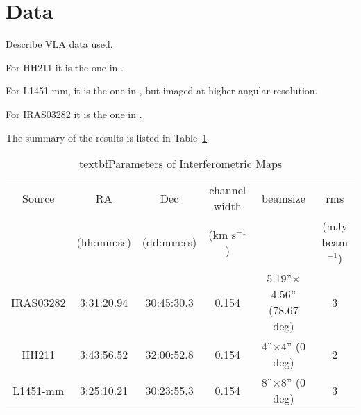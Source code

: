 \section{Data}

Describe VLA data used.

For HH211 it is the one in \cite{Tanner_2010}.

For L1451-mm, it is the one in \cite{Pineda_2011}, but imaged at higher angular resolution.

For IRAS03282 it is the one in \cite{Tobin_2011}. 

The summary of the results is listed in Table~\ref{table:obs}

\begin{table} 
\label{table:obs}
    \begin{tabular}{ c c c c c c }
        Source & RA & Dec & channel width & beamsize & rms \\ 
         & (hh:mm:ss) & (dd:mm:ss) & (km s$^{-1}$) &  & (mJy beam$^{-1}$) \\ 
        IRAS03282 & 3:31:20.94 & 30:45:30.3 & 0.154 & 5.19''$\times$4.56'' (78.67 deg) & 3 \\ 
        HH211 & 3:43:56.52 & 32:00:52.8 & 0.154 & 4''$\times$4'' (0 deg) & 2 \\ 
        L1451-mm & 3:25:10.21 & 30:23:55.3 & 0.154 & 8''$\times$8'' (0 deg) & 3 \\ 
    \end{tabular} 
    \caption{textbf{Parameters of Interferometric Maps}}
\end{table}
  
  
  
  
  
  
  
  
  
  
  
  
  
  